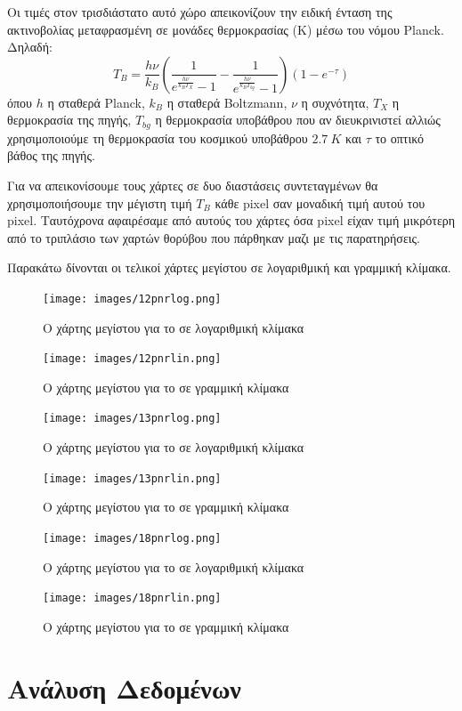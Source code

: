 \documentclass[a4paper,12pt]{memoir}
\begin{document}
Οι τιμές στον τρισδιάστατο αυτό χώρο απεικονίζουν την ειδική ένταση της ακτινοβολίας μεταφρασμένη σε μονάδες θερμοκρασίας (K) μέσω του νόμου Planck. Δηλαδή:
\begin{equation}
\label{eq:TB}
T_B=\frac{h \nu}{k_B} \left( \frac{1}{e^{\frac{h \nu}{k_B T_X}}-1}-\frac{1}{e^{\frac{h \nu}{k_B T_{bg}}}-1} \right) \left( 1-e^{-\tau} \right) 
\end{equation}
όπου $h$ η σταθερά Planck, $k_B$ η σταθερά Boltzmann, $\nu$ η συχνότητα, $T_X$ η θερμοκρασία της πηγής, $T_{bg} $ η θερμοκρασία υποβάθρου που αν διευκρινιστεί αλλιώς χρησιμοποιούμε τη θερμοκρασία του κοσμικού υποβάθρου $2.7\ K$ και $\tau$ το οπτικό βάθος της πηγής.

Για να απεικονίσουμε τους χάρτες σε δυο διαστάσεις συντεταγμένων θα χρησιμοποιήσουμε την μέγιστη
 τιμή $T_B$ κάθε pixel σαν μοναδική τιμή αυτού του pixel. Ταυτόχρονα αφαιρέσαμε από αυτούς του χάρτες όσα pixel είχαν τιμή μικρότερη από το τριπλάσιο των χαρτών θορύβου που πάρθηκαν μαζι με τις παρατηρήσεις.

Παρακάτω δίνονται οι τελικοί χάρτες μεγίστου σε λογαριθμική και γραμμική κλίμακα.

\begin{figure}[hb]
	\centering
	\texttt{[image: images/12pnrlog.png]}
	\caption{Ο χάρτης μεγίστου για το  σε λογαριθμική κλίμακα}

	\centering
	\texttt{[image: images/12pnrlin.png]}
	\caption{Ο χάρτης μεγίστου για το  σε γραμμική κλίμακα}
\end{figure}

\begin{figure}[hb]
	\centering
		\texttt{[image: images/13pnrlog.png]}
		\caption{Ο χάρτης μεγίστου για το  σε λογαριθμική κλίμακα}


	\centering
	\texttt{[image: images/13pnrlin.png]}
	\caption{Ο χάρτης μεγίστου για το  σε γραμμική κλίμακα}
\end{figure}

\begin{figure}[hb]
	\centering
	\texttt{[image: images/18pnrlog.png]}
	\caption{Ο χάρτης μεγίστου για το  σε λογαριθμική κλίμακα}


	\centering
	\texttt{[image: images/18pnrlin.png]}
	\caption{Ο χάρτης μεγίστου για το  σε γραμμική κλίμακα}
\end{figure}

\chapter{Ανάλυση Δεδομένων}
\end{document}
